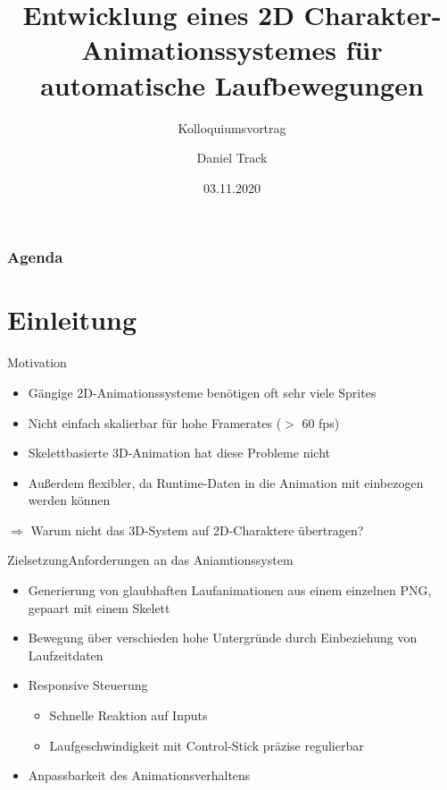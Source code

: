 \documentclass[t,aspectratio=169,divpsnames]{beamer}
\title{Entwicklung eines 2D Charakter-Animationssystemes für automatische Laufbewegungen}
\subtitle{Kolloquiumsvortrag}
\author{Daniel Track}
\institute{Hochschule Trier}
\date{03.11.2020}
\begin{document}
\begin{frame}
    \titlepage
\end{frame}

\begin{frame}
    \frametitle{Agenda}
    \tableofcontents
\end{frame}

\section{Einleitung}

\begin{frame}{Motivation}
    \begin{itemize}
        \item Gängige 2D-Animationssysteme benötigen oft sehr viele Sprites %
        \item Nicht einfach skalierbar für hohe Framerates ($>$ 60 fps)
        \item Skelettbasierte 3D-Animation hat diese Probleme nicht
        \item Außerdem flexibler, da Runtime-Daten in die Animation mit einbezogen werden können
    \end{itemize}

    $\Rightarrow$ Warum nicht das 3D-System auf 2D-Charaktere übertragen?
\end{frame}

\begin{frame}{Zielsetzung}{Anforderungen an das Aniamtionssystem}
    \begin{itemize}
        \item Generierung von glaubhaften Laufanimationen aus einem einzelnen PNG, gepaart mit einem Skelett
        \item Bewegung über verschieden hohe Untergründe durch Einbeziehung von Laufzeitdaten
        \item Responsive Steuerung
              \begin{itemize}
                  \item Schnelle Reaktion auf Inputs
                  \item Laufgeschwindigkeit mit Control-Stick präzise regulierbar
              \end{itemize}
        \item Anpassbarkeit des Animationsverhaltens
    \end{itemize}
\end{frame}
\end{document}
